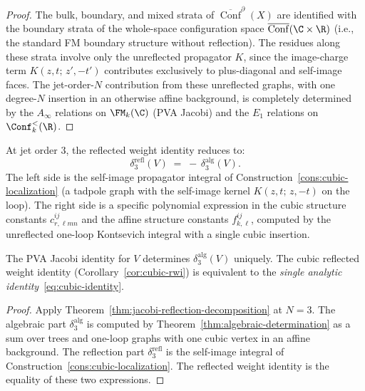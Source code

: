 \begin{proof}
The bulk, boundary, and mixed strata of
$\overline{\operatorname{Conf}}^{\partial}(X)$ are identified with
the boundary strata of the whole-space configuration space
$\overline{\operatorname{Conf}}(\C\times\R)$ (i.e., the standard FM
boundary structure without reflection). The residues along these
strata involve only the unreflected propagator $K$, since the
image-charge term $K(z,t;\,z',-t')$ contributes exclusively to
plus-diagonal and self-image faces. The jet-order-$N$ contribution from these
unreflected graphs, with one degree-$N$ insertion in an otherwise
affine background, is completely determined by the $A_\infty$
relations on $\FM_k(\C)$ (PVA Jacobi) and the $E_1$ relations on
$\Conf_k^{<}(\R)$.
\end{proof}

\begin{corollary}
\label{cor:cubic-identity}
At jet order $3$, the reflected weight identity reduces to:
\begin{equation}\label{eq:cubic-identity}
\delta_3^{\mathrm{refl}}(V)
\;=\;
-\,\delta_3^{\mathrm{alg}}(V).
\end{equation}
The left side is the self-image propagator integral of
Construction~\ref{cons:cubic-localization} (a tadpole graph with the
self-image kernel $K(z,t;\,z,-t)$ on the loop). The right side is a
specific polynomial expression in the cubic structure constants
$c^{ij}_{r,\ell mn}$ and the affine structure constants
$f^{ij}_{k,\ell}$, computed by the unreflected one-loop Kontsevich
integral with a single cubic insertion.

The PVA Jacobi identity for $V$ determines
$\delta_3^{\mathrm{alg}}(V)$ uniquely. The cubic reflected weight
identity (Corollary~\ref{cor:cubic-rwi}) is equivalent to the
\emph{single analytic identity}~\eqref{eq:cubic-identity}.
\end{corollary}

\begin{proof}
Apply Theorem~\ref{thm:jacobi-reflection-decomposition} at $N=3$.
The algebraic part $\delta_3^{\mathrm{alg}}$ is computed by
Theorem~\ref{thm:algebraic-determination} as a sum over trees and
one-loop graphs with one cubic vertex in an affine background. The
reflection part $\delta_3^{\mathrm{refl}}$ is the self-image integral
of Construction~\ref{cons:cubic-localization}. The reflected weight
identity is the equality of these two expressions.
\end{proof}

